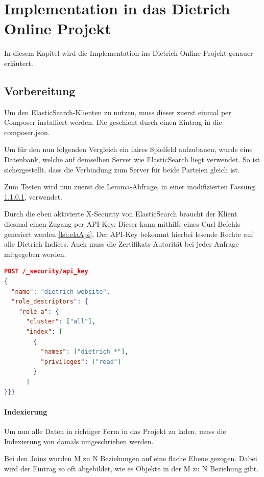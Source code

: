 \chapter{Implementation in das Dietrich Online Projekt}

In diesem Kapitel wird die Implementation ins Dietrich Online Projekt genauer erläutert.

\section{Vorbereitung}

Um den ElasticSearch-Klienten zu nutzen, muss dieser zuerst einmal per Composer installiert werden. Die geschieht durch einen Eintrag in die composer.json.

Um für den nun folgenden Vergleich ein faires Spielfeld aufzubauen, wurde eine Datenbank, welche auf demselben Server wie ElasticSearch liegt verwendet. So ist sichergestellt, dass die Verbindung zum Server für beide Parteien gleich ist.

Zum Testen wird nun zuerst die Lemma-Abfrage, in einer modifizierten Fassung \ref{lemmaIndexierungEla}, verwendet.

Durch die eben aktivierte X-Security von ElasticSearch braucht der Klient diesmal einen Zugang per API-Key. Dieser kann mithilfe eines Curl Befehls generiert werden \ref{lst:elaApi}. Der API-Key bekommt hierbei lesende Rechte auf alle Dietrich Indices. Auch muss die Zertifikats-Autorität bei jeder Anfrage mitgegeben werden. 

\begin{lstlisting}[language=JSON, frame=single, label={lst:elaApi}] 
POST /_security/api_key
{
  "name": "dietrich-website",
  "role_descriptors": { 
    "role-a": {
      "cluster": ["all"],
      "index": [
        {
          "names": ["dietrich_*"],
          "privileges": ["read"]
        }
      ]
}}}
\end{lstlisting}


\subsubsection{Indexierung}
\label{lemmaIndexierungEla}

Um nun alle Daten in richtiger Form in das Projekt zu laden, muss die Indexierung von damals umgeschrieben werden. 

Bei den Joins wurden M zu N Beziehungen auf eine flache Ebene gezogen. Dabei wird der Eintrag so oft abgebildet, wie es Objekte in der M zu N Beziehung gibt. 

